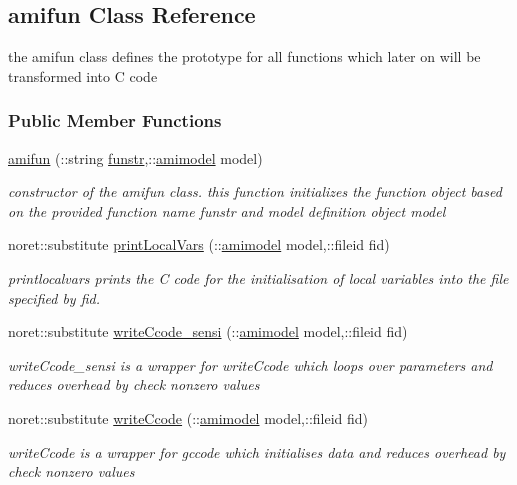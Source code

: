 \hypertarget{classamifun}{}\subsection{amifun Class Reference}
\label{classamifun}


the amifun class defines the prototype for all functions which later on will be transformed into C code  


\subsubsection*{Public Member Functions}
\begin{DoxyCompactItemize}
\item 
\hyperlink{classamifun_a83573a48686a6e649362ee3f6ed185ff}{amifun} (\+::string \hyperlink{classamifun_a484b54379bc8b29b6ce65d84966ea4c4}{funstr},\+::\hyperlink{classamimodel}{amimodel} model)
\begin{DoxyCompactList}\small\item\em constructor of the amifun class. this function initializes the function object based on the provided function name funstr and model definition object model \end{DoxyCompactList}\item 
noret\+::substitute \hyperlink{classamifun_a65387b406e8c310f20057ac62940dd2a}{print\+Local\+Vars} (\+::\hyperlink{classamimodel}{amimodel} model,\+::fileid fid)
\begin{DoxyCompactList}\small\item\em printlocalvars prints the C code for the initialisation of local variables into the file specified by fid. \end{DoxyCompactList}\item 
noret\+::substitute \hyperlink{classamifun_a7845c1193d9a963f7bb9802f1eeefac7}{write\+Ccode\+\_\+sensi} (\+::\hyperlink{classamimodel}{amimodel} model,\+::fileid fid)
\begin{DoxyCompactList}\small\item\em write\+Ccode\+\_\+sensi is a wrapper for write\+Ccode which loops over parameters and reduces overhead by check nonzero values \end{DoxyCompactList}\item 
noret\+::substitute \hyperlink{classamifun_a8e48f2842268ff64ca32db8eb4b69377}{write\+Ccode} (\+::\hyperlink{classamimodel}{amimodel} model,\+::fileid fid)
\begin{DoxyCompactList}\small\item\em write\+Ccode is a wrapper for gccode which initialises data and reduces overhead by check nonzero values \end{DoxyCompactList}\item 

\end{DoxyCompactItemize}
